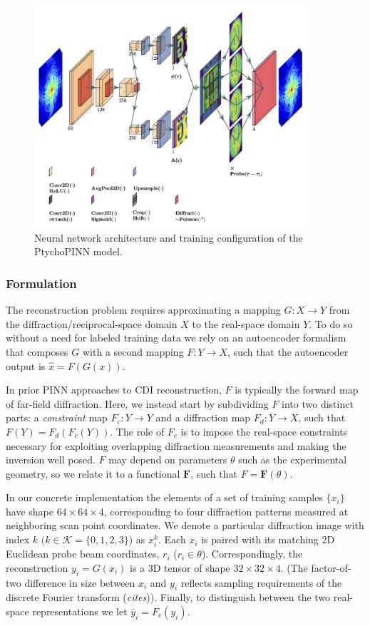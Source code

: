 \documentclass[sn-mathphys]{sn-jnl}%
\theoremstyle{thmstyleone}%
\theoremstyle{thmstyletwo}%
\theoremstyle{thmstylethree}%
\begin{document}
\begin{figure}[h]%
\centering
\includegraphics[width=0.9\textwidth]{figures/lett.png}
\caption{Neural network architecture and training configuration of the PtychoPINN model.}\label{diagram}
\end{figure}


\subsubsection{Formulation}
The reconstruction problem requires approximating a mapping $G: X \rightarrow Y$ from the diffraction/reciprocal-space domain $X$ to the real-space domain $Y$. 
To do so without a need for labeled training data we rely on an autoencoder formalism that composes $G$ with a second mapping $F: Y \rightarrow X$, such that the autoencoder output is $\hat{x} = F(G(x))$. 

In prior PINN approaches to CDI reconstruction, $F$ is typically the forward map of far-field diffraction. Here, we instead start by subdividing $F$ into two distinct parts: a \emph{constraint} map $ F_c: Y \rightarrow Y$ and a diffraction map $ F_d: Y \rightarrow X$, such that $F(Y) = F_d(F_c(Y))$. The role of $F_c$ is to impose the real-space constraints necessary for exploiting overlapping diffraction measurements and making the inversion well posed. $F$ may depend on parameters $\theta$ such as the experimental geometry, so we relate it to a functional $\mathbf{F}$, such that $F = \mathbf{F}(\theta)$.

In our concrete implementation the elements of a set of training samples $\{x_i\}$ have shape $64 \times 64 \times 4$, corresponding to four diffraction patterns measured at neighboring scan point coordinates. We denote a particular diffraction image with index $k$ $(k \in \mathcal{K} = \{0, 1, 2, 3\}$) as $x_i^k$. Each $x_i$ is paired with its matching 2D Euclidean probe beam coordinates, $r_i$ ($r_i \in \theta$). Correspondingly, the reconstruction $y_i = G(x_i)$ is a 3D tensor of shape $32 \times 32 \times 4$. (The factor-of-two difference in size between $x_i$ and $y_i$ reflects sampling requirements of the discrete Fourier transform (\emph{cites})). Finally, to distinguish between the two real-space representations we let $\bar{y}_i = F_c(y_i)$.
\end{document}
